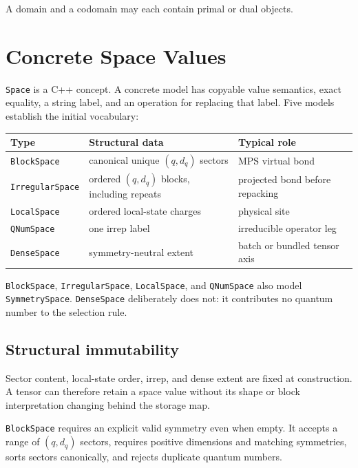 \documentclass[11pt]{article}
\begin{document}
A domain and a codomain may each contain primal or dual objects.

\section{Concrete Space Values}

\texttt{Space} is a C++ concept.  A concrete model has copyable value
semantics, exact equality, a string label, and an operation for
replacing that label.  Five models establish the initial vocabulary:

\begin{center}
\begin{tabular}{@{}l>{\raggedright\arraybackslash}p{}
                    >{\raggedright\arraybackslash}p{}@{}}
\toprule
Type & Structural data & Typical role \\
\midrule
\texttt{BlockSpace}
  & canonical unique \((q,d_q)\) sectors
  & MPS virtual bond \\
\texttt{IrregularSpace}
  & ordered \((q,d_q)\) blocks, including repeats
  & projected bond before repacking \\
\texttt{LocalSpace}
  & ordered local-state charges
  & physical site \\
\texttt{QNumSpace}
  & one irrep label
  & irreducible operator leg \\
\texttt{DenseSpace}
  & symmetry-neutral extent
  & batch or bundled tensor axis \\
\bottomrule
\end{tabular}
\end{center}

\texttt{BlockSpace}, \texttt{IrregularSpace}, \texttt{LocalSpace}, and
\texttt{QNumSpace} also model \texttt{SymmetrySpace}.
\texttt{DenseSpace} deliberately does not: it contributes no quantum
number to the selection rule.

\subsection{Structural immutability}

Sector content, local-state order, irrep, and dense extent are fixed at
construction.  A tensor can therefore retain a space value without
its shape or block interpretation changing behind the storage map.

\texttt{BlockSpace} requires an explicit valid symmetry even when
empty.  It accepts a range of \((q,d_q)\) sectors, requires positive
dimensions and matching symmetries, sorts sectors canonically, and
rejects duplicate quantum numbers.
\end{document}

